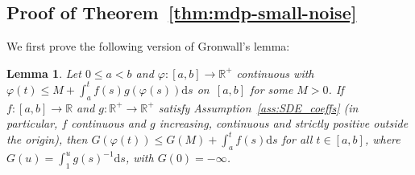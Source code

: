 \documentclass{amsart}[11pt]
\numberwithin{equation}{section}
\numberwithin{theorem}{subsection}
\numberwithin{proposition}{subsection}
\numberwithin{definition}{subsection}
\newtheorem{lemma}{Lemma}
\numberwithin{lemma}{subsection}
\numberwithin{assumption}{subsection}
\newcommand{\RR}{\mathbb{R}}
\newcommand{\D}{\mathrm{d}}
\begin{document}
\subsection{Proof of Theorem~\ref{thm:mdp-small-noise}}\label{sec:thm:mdp-small-noise_Proof}
We first prove the following version of Gronwall's lemma:
\begin{lemma}\label{lem:Gronwall-bis}
Let $0\leq a < b$ and $\varphi:[a,b]\rightarrow \RR^+$ continuous with
${\varphi(t)\leq M + \int_a^t f(s) g(\varphi(s))\D s}$ on~$[a,b]$ for some $M>0$.
If $f:[a,b]\rightarrow \RR$ and $g:\RR^+\rightarrow\RR^+$ satisfy Assumption~\ref{ass:SDE_coeffs}
(in particular, $f$ continuous and $g$ increasing, continuous and strictly positive outside the origin), then
$G(\varphi(t)) \leq G(M) + \int_a^t f(s)\D s$ for all $t \in [a,b]$,
where $G(u) = \int_1^u g(s)^{-1}\D s$, with $G(0) = -\infty$.
\end{lemma}
\end{document}
